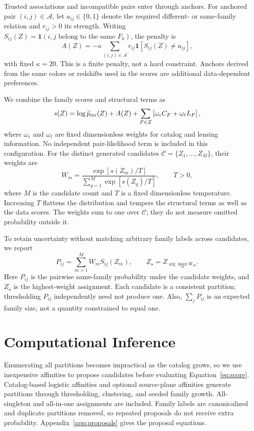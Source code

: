 \documentclass[twocolumn,twocolappendix,linenumbers]{aastex701}
\newcommand{\ind}{\mathbf{1}}
\begin{document}
Trusted associations and incompatible pairs enter through anchors.
For anchored pair $(i,j)\in\mathcal A$, let $a_{ij}\in\{0,1\}$ denote the required different- or same-family relation and $r_{ij}>0$ its strength.
Writing $S_{ij}(Z)=\ind(i,j\text{ belong to the same }F_k)$, the penalty is
\begin{equation}
 A(Z)=-\kappa\sum_{(i,j)\in\mathcal A}
 r_{ij}\ind[S_{ij}(Z)\ne a_{ij}],
 \label{eq:anchors}
\end{equation}
with fixed $\kappa=20$.
This is a finite penalty, not a hard constraint.
Anchors derived from the same colors or redshifts used in the scores are additional data-dependent preferences.

We combine the family scores and structural terms as
\begin{equation}
 s(Z)=\log\widetilde p_{\rm str}(Z)+A(Z)
       +\sum_{F\in Z}\left[\omega_c C_F+\omega_\ell L_F\right],
 \label{eq:score}
\end{equation}
where $\omega_c$ and $\omega_\ell$ are fixed dimensionless weights for catalog and lensing information.
No independent pair-likelihood term is included in this configuration.
For the distinct generated candidates $\mathcal C=\{Z_1,\ldots,Z_M\}$, their weights are
\begin{equation}
 W_m=\frac{\exp[s(Z_m)/T]}{\sum_{q=1}^{M}\exp[s(Z_q)/T]},
 \qquad T>0,
 \label{eq:weights}
\end{equation}
where $M$ is the candidate count and $T$ is a fixed dimensionless temperature.
Increasing $T$ flattens the distribution and tempers the structural terms as well as the data scores.
The weights sum to one over $\mathcal C$; they do not measure omitted probability outside it.

To retain uncertainty without matching arbitrary family labels across candidates, we report
\begin{equation}
 P_{ij}=\sum_{m=1}^{M}W_m S_{ij}(Z_m),
 \qquad Z_\star=Z_{\arg\max_m W_m}.
 \label{eq:pairprob}
\end{equation}
Here $P_{ij}$ is the pairwise same-family probability under the candidate weights, and $Z_\star$ is the highest-weight assignment.
Each candidate is a consistent partition; thresholding $P_{ij}$ independently need not produce one.
Also, $\sum_jP_{ij}$ is an expected family size, not a quantity constrained to equal one.

\section{Computational Inference}
\label{sec:computation}
Enumerating all partitions becomes impractical as the catalog grows, so we use inexpensive affinities to propose candidates before evaluating Equation~\ref{eq:score}.
Catalog-based logistic affinities and optional source-plane affinities generate partitions through thresholding, clustering, and seeded family growth.
All-singleton and all-in-one assignments are included.
Family labels are canonicalized and duplicate partitions removed, so repeated proposals do not receive extra probability.
Appendix~\ref{app:proposals} gives the proposal equations.
\end{document}
